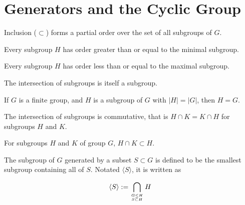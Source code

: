 \section{Generators and the Cyclic Group}

\begin{theorem}
    \label{theorem : PartialOrder (Subgroup G)}
    Inclusion ($\subset$) forms a partial order over the set of all subgroups of $G$.
\end{theorem}

\begin{theorem}
    \label{theorem : Minimal_smallest}
    \leanok
    Every subgroup $H$ has order greater than or equal to the minimal subgroup.
\end{theorem}

\begin{theorem}
    \label{theorem : Maximal_largest}
    \leanok
    Every subgroup $H$ has order less than or equal to the maximal subgroup.
\end{theorem}

\begin{theorem}
    \label{definition : Intersect}
    \leanok
    The intersection of subgroups is itself a subgroup.
\end{theorem}

\begin{theorem}
    \label{definition : subgroup_eq_Maximal_of_card_eq_G}
    If $G$ is a finite group, and $H$ is a subgroup of $G$ with $|H| = |G|$, then $H = G$.
\end{theorem}

\begin{theorem}
    \label{theorem : inter_comm}
    The intersection of subgroups is commutative, that is $H \cap K = K \cap H$ for subgroups $H$ and $K$.
\end{theorem}

\begin{theorem}
    \label{theorem : le_intersect_self}
    For subgroups $H$ and $K$ of group $G$, $H \cap K \subset H$.
\end{theorem}

\begin{definition}
    \label{definition : Generate}
    \leanok
    The subgroup of $G$ generated by a subset $S \subset G$ is defined to be the smallest subgroup containing all of $S$. Notated $\langle S \rangle$, it is written as

    \begin{equation*}
        \langle S \rangle := \bigcap_{\genfrac{}{}{0pt}{}{G \le H}{S \subset H}} H
    \end{equation*}
\end{definition}

